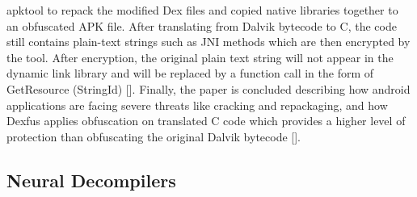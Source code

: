 \documentclass[conference,a4paper]{IEEEtran}
\begin{document}
apktool to repack the modified Dex files and copied native libraries together to an obfuscated APK file. After translating from Dalvik bytecode to C, the code still contains plain-text strings such as JNI methods which are then encrypted by the tool. After encryption, the original plain text string will not appear in the dynamic link library and will be replaced by a function call in the form of GetResource (StringId) [].
Finally, the paper is concluded describing how android applications are facing severe threats like cracking and repackaging, and how Dexfus applies obfuscation on translated C code which provides a higher level of protection than obfuscating the original Dalvik bytecode [].

\subsection{Neural Decompilers}
\end{document}
